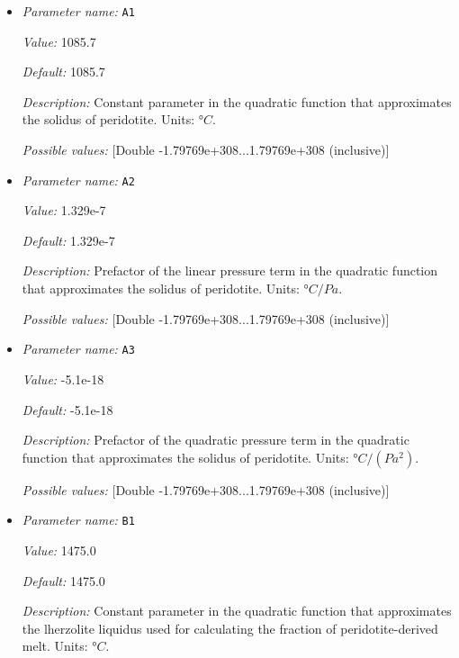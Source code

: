 \begin{itemize}
\item {\it Parameter name:} {\tt A1}
\label{parameters:Postprocess/Visualization/Melt fraction/A1}


{\it Value:} 1085.7


{\it Default:} 1085.7


{\it Description:} Constant parameter in the quadratic function that approximates the solidus of peridotite. Units: $°C$.


{\it Possible values:} [Double -1.79769e+308...1.79769e+308 (inclusive)]
\item {\it Parameter name:} {\tt A2}
\label{parameters:Postprocess/Visualization/Melt fraction/A2}


{\it Value:} 1.329e-7


{\it Default:} 1.329e-7


{\it Description:} Prefactor of the linear pressure term in the quadratic function that approximates the solidus of peridotite. Units: $°C/Pa$.


{\it Possible values:} [Double -1.79769e+308...1.79769e+308 (inclusive)]
\item {\it Parameter name:} {\tt A3}
\label{parameters:Postprocess/Visualization/Melt fraction/A3}


{\it Value:} -5.1e-18


{\it Default:} -5.1e-18


{\it Description:} Prefactor of the quadratic pressure term in the quadratic function that approximates the solidus of peridotite. Units: $°C/(Pa^2)$.


{\it Possible values:} [Double -1.79769e+308...1.79769e+308 (inclusive)]
\item {\it Parameter name:} {\tt B1}
\label{parameters:Postprocess/Visualization/Melt fraction/B1}


{\it Value:} 1475.0


{\it Default:} 1475.0


{\it Description:} Constant parameter in the quadratic function that approximates the lherzolite liquidus used for calculating the fraction of peridotite-derived melt. Units: $°C$.



\end{itemize}
